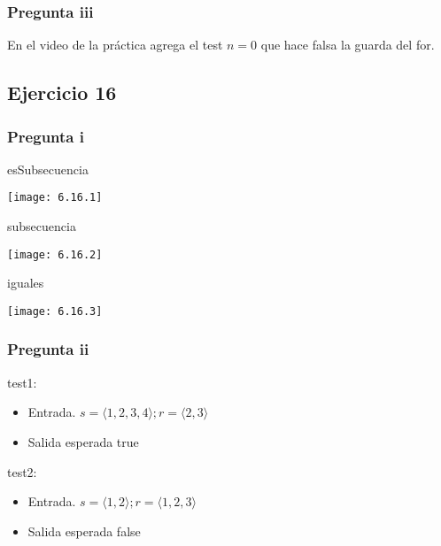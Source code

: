 \subsubsection{Pregunta iii}
En el video de la práctica agrega el test $ n = 0 $ que hace falsa la guarda del for.

\subsection{Ejercicio 16}
\subsubsection{Pregunta i}
esSubsecuencia

\texttt{[image: 6.16.1]}

subsecuencia

\texttt{[image: 6.16.2]}

iguales

\texttt{[image: 6.16.3]}

\subsubsection{Pregunta ii}
test1:
\begin{itemize}
    \item Entrada. $ s = \langle 1,2,3,4 \rangle; r = \langle 2,3 \rangle $
    \item Salida esperada true
\end{itemize}

test2:
\begin{itemize}
    \item Entrada. $ s = \langle 1,2 \rangle; r = \langle 1,2,3 \rangle $
    \item Salida esperada false
\end{itemize}


